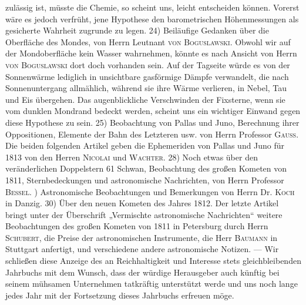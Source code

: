 zulässig ist, müsste die Chemie, so scheint uns, leicht entscheiden können. Vorerst wäre es jedoch verfrüht, jene Hypothese den barometrischen Höhenmessungen als gesicherte Wahrheit zugrunde zu legen. 24) Beiläufige Gedanken über die Oberfläche des Mondes, von Herrn Leutnant \textsc{von Boguslawski}. Obwohl wir auf der Mondoberfläche kein Wasser wahrnehmen, könnte es nach Ansicht von Herrn \textsc{von Boguslawski} dort doch vorhanden sein. Auf der Tagseite würde es von der Sonnenwärme lediglich in unsichtbare gasförmige Dämpfe verwandelt, die nach Sonnenuntergang allmählich, während sie ihre Wärme verlieren, in Nebel, Tau und Eis übergehen. Das augenblickliche Verschwinden der Fixsterne, wenn sie vom dunklen Mondrand bedeckt werden, scheint uns ein wichtiger Einwand gegen diese Hypothese zu sein. 25) Beobachtung von Pallas und Juno, Berechnung ihrer Oppositionen, Elemente der Bahn des Letzteren usw. von Herrn Professor \textsc{Gauss}. Die beiden folgenden Artikel geben die Ephemeriden von Pallas und Juno für 1813 von den Herren \textsc{Nicolai} und \textsc{Wachter}. 28) Noch etwas über den veränderlichen Doppelstern 61 Schwan, Beobachtung des großen Kometen von 1811, Sternbedeckungen und astronomische Nachrichten, von Herrn Professor \textsc{Bessel}. ) Astronomische Beobachtungen und Bemerkungen von Herrn Dr. \textsc{Koch} in Danzig. 30) Über den neuen Kometen des Jahres 1812. Der letzte Artikel bringt unter der Überschrift „Vermischte astronomische Nachrichten“ weitere Beobachtungen des großen Kometen von 1811 in Petersburg durch Herrn \textsc{Schubert}, die Preise der astronomischen Instrumente, die Herr \textsc{Baumann} in Stuttgart anfertigt, und verschiedene andere astronomische Notizen. --- Wir schließen diese Anzeige des an Reichhaltigkeit und Interesse stets gleichbleibenden Jahrbuchs mit dem Wunsch, dass der würdige Herausgeber auch künftig bei seinem mühsamen Unternehmen tatkräftig unterstützt werde und uns noch lange jedes Jahr mit der Fortsetzung dieses Jahrbuchs erfreuen möge.
